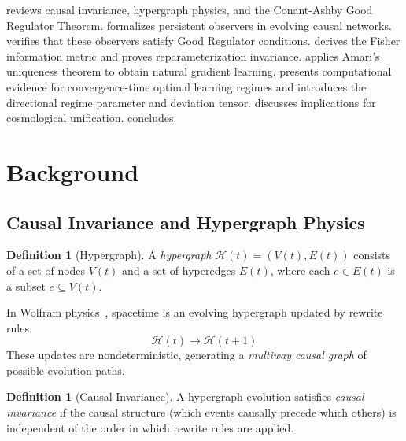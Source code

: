 \documentclass[11pt,a4paper]{article}
\theoremstyle{plain}
\theoremstyle{definition}
\newtheorem{definition}[theorem]{Definition}
\theoremstyle{remark}
\newcommand{\HG}{\mathcal{H}}
\begin{document}
 reviews causal invariance, hypergraph physics, and the Conant-Ashby Good Regulator Theorem.  formalizes persistent observers in evolving causal networks.  verifies that these observers satisfy Good Regulator conditions.  derives the Fisher information metric and proves reparameterization invariance.  applies Amari's uniqueness theorem to obtain natural gradient learning.  presents computational evidence for convergence-time optimal learning regimes and introduces the directional regime parameter and deviation tensor.  discusses implications for cosmological unification.  concludes.


\section{Background}
\label{sec:background}

\subsection{Causal Invariance and Hypergraph Physics}

\begin{definition}[Hypergraph]
A \emph{hypergraph} $\HG(t) = (V(t), E(t))$ consists of a set of nodes $V(t)$ and a set of hyperedges $E(t)$, where each $e \in E(t)$ is a subset $e \subseteq V(t)$.
\end{definition}

In Wolfram physics~\cite{wolfram2020ruliad}, spacetime is an evolving hypergraph updated by rewrite rules:
\begin{equation}
\HG(t) \to \HG(t+1)
\end{equation}
These updates are nondeterministic, generating a \emph{multiway causal graph} of possible evolution paths.

\begin{definition}[Causal Invariance]
\label{def:causal_invariance}
A hypergraph evolution satisfies \emph{causal invariance} if the causal structure (which events causally precede which others) is independent of the order in which rewrite rules are applied.
\end{definition}
\end{document}
